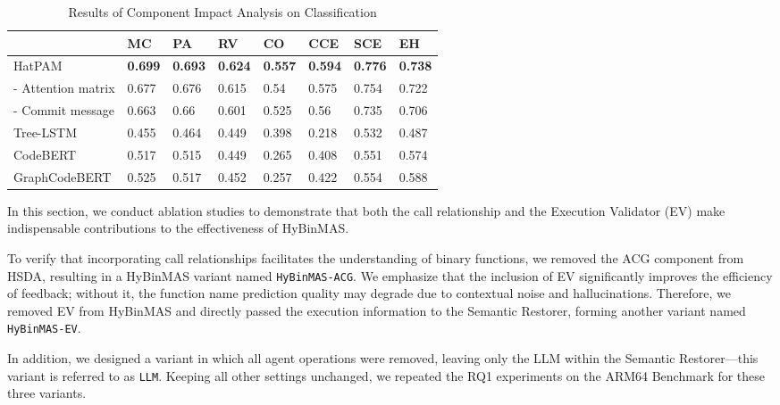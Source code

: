 \documentclass[acmsmall,screen,review,anonymous]{acmart} %
\begin{document}
\renewcommand\arraystretch{1.31}
\begin{table}
  \centering
  \scriptsize
  \caption{Results of Component Impact Analysis on Classification}
    \begin{tabular}{p{2.5cm}p{.8cm}p{.8cm}p{.8cm}p{.8cm} p{.8cm}p{.8cm}p{.8cm}}
    \toprule
    &\textbf{MC} &\textbf{PA} &\textbf{RV} &\textbf{CO} & \textbf{CCE} &\textbf{SCE} &\textbf{EH} \\
    \hline
    HatPAM & \textbf{0.699} & \textbf{0.693} & \textbf{0.624} & \textbf{0.557} & \textbf{0.594} & \textbf{0.776} & \textbf{0.738}\\
    - Attention matrix & 0.677 & 0.676 & 0.615 & 0.54 & 0.575 & 0.754 & 0.722 \\
    - Commit message & 0.663 & 0.66 & 0.601 & 0.525 & 0.56 & 0.735 & 0.706 \\
    \hline
    Tree-LSTM & 0.455 & 0.464 & 0.449 & 0.398 & 0.218 & 0.532 & 0.487\\
     \hline
    CodeBERT & 0.517 & 0.515 & 0.449 & 0.265 & 0.408 & 0.551 & 0.574\\
    \hline
    GraphCodeBERT & 0.525 & 0.517 & 0.452 & 0.257 & 0.422 & 0.554 & 0.588\\
    \hline
    \end{tabular}%
\end{table}%
\renewcommand\arraystretch{1.0}

In this section, we conduct ablation studies to demonstrate that both the call relationship and the Execution Validator (EV) make indispensable contributions to the effectiveness of HyBinMAS.

To verify that incorporating call relationships facilitates the understanding of binary functions, we removed the ACG component from HSDA, resulting in a HyBinMAS variant named \texttt{HyBinMAS-ACG}. We emphasize that the inclusion of EV significantly improves the efficiency of feedback; without it, the function name prediction quality may degrade due to contextual noise and hallucinations. Therefore, we removed EV from HyBinMAS and directly passed the execution information to the Semantic Restorer, forming another variant named \texttt{HyBinMAS-EV}.

In addition, we designed a variant in which all agent operations were removed, leaving only the LLM within the Semantic Restorer—this variant is referred to as \texttt{LLM}. Keeping all other settings unchanged, we repeated the RQ1 experiments on the ARM64 Benchmark for these three variants.
\end{document}
